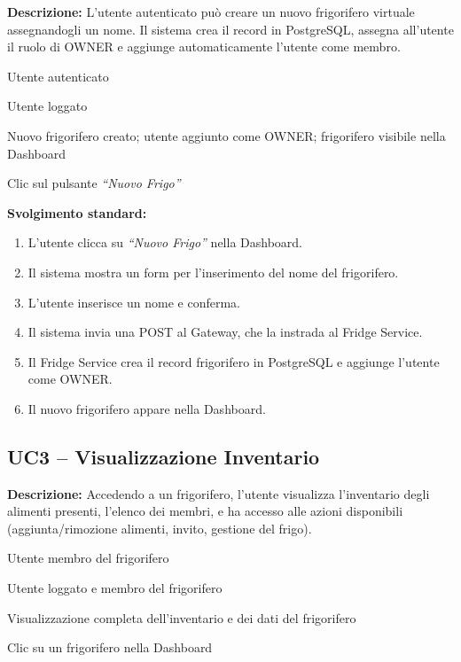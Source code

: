 \documentclass[12pt,a4paper,twoside]{report}
\newenvironment{ucbox}{%
  \begin{mdframed}[
    backgroundcolor=ucbg,
    linecolor=ucborder,
    linewidth=1pt,
    innerleftmargin=10pt,
    innerrightmargin=10pt,
    innertopmargin=8pt,
    innerbottommargin=8pt,
    roundcorner=4pt
  ]
}{%
  \end{mdframed}
}
\begin{document}
\begin{ucbox}
\textbf{Descrizione:} L'utente autenticato può creare un nuovo frigorifero virtuale assegnandogli un nome. Il sistema crea il record in PostgreSQL, assegna all'utente il ruolo di OWNER e aggiunge automaticamente l'utente come membro.

\begin{description}[leftmargin=4cm, style=sameline]
  \item[Attori Coinvolti:] Utente autenticato
  \item[Precondizione:] Utente loggato
  \item[Postcondizione:] Nuovo frigorifero creato; utente aggiunto come OWNER; frigorifero visibile nella Dashboard
  \item[Trigger:] Clic sul pulsante \textit{``Nuovo Frigo''}
\end{description}
\end{ucbox}

\textbf{Svolgimento standard:}
\begin{enumerate}
  \item L'utente clicca su \textit{``Nuovo Frigo''} nella Dashboard.
  \item Il sistema mostra un form per l'inserimento del nome del frigorifero.
  \item L'utente inserisce un nome e conferma.
  \item Il sistema invia una POST al Gateway, che la instrada al Fridge Service.
  \item Il Fridge Service crea il record frigorifero in PostgreSQL e aggiunge l'utente come OWNER.
  \item Il nuovo frigorifero appare nella Dashboard.
\end{enumerate}

\newpage
\subsection{UC3 -- Visualizzazione Inventario}

\begin{ucbox}
\textbf{Descrizione:} Accedendo a un frigorifero, l'utente visualizza l'inventario degli alimenti presenti, l'elenco dei membri, e ha accesso alle azioni disponibili (aggiunta/rimozione alimenti, invito, gestione del frigo).

\begin{description}[leftmargin=4cm, style=sameline]
  \item[Attori Coinvolti:] Utente membro del frigorifero
  \item[Precondizione:] Utente loggato e membro del frigorifero
  \item[Postcondizione:] Visualizzazione completa dell'inventario e dei dati del frigorifero
  \item[Trigger:] Clic su un frigorifero nella Dashboard
\end{description}
\end{ucbox}
\end{document}
